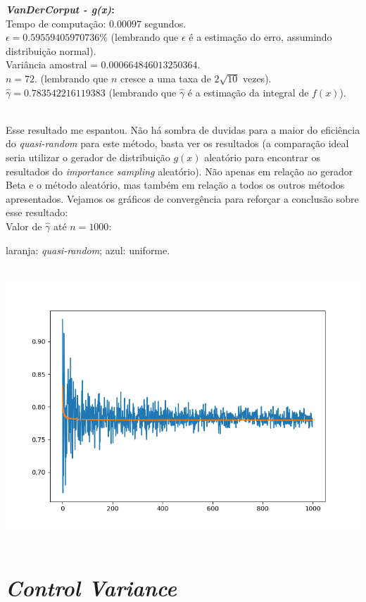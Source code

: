 \documentclass[pt12]{article}
\begin{document}
\textbf{\textit{VanDerCorput - g(x)}:}\\
\noindent Tempo de computação: $0.00097$ segundos.\\
\noindent $\epsilon = 0.59559405970736\%$ (lembrando que $\epsilon$ é a estimação do erro, assumindo distribuição normal).\\
\noindent Variância amostral = $0.000664846013250364$.\\
\noindent $n = 72$. (lembrando que $n$ cresce a uma taxa de $2\sqrt{10}$ vezes).\\
\noindent $\hat{\gamma} = 0.783542216119383$ (lembrando que $\hat{\gamma}$ é a estimação da integral de $f(x)$).\\
\ 

Esse resultado me espantou. Não há sombra de duvidas para a maior do eficiência do \textit{quasi-random} para este método, basta ver os resultados (a comparação ideal seria utilizar o gerador de distribuição $g(x)$ aleatório para encontrar os resultados do \textit{importance sampling} aleatório). Não apenas em relação ao gerador Beta e o método aleatório, mas também em relação a todos os outros métodos apresentados. Vejamos os gráficos de convergência para reforçar a conclusão sobre esse resultado:\\


Valor de $\hat{\gamma}$ até $n=1000$:\\
\indent \begin{small}laranja: \textit{quasi-random}; azul: uniforme.\end{small}\\
\includegraphics[scale=0.7]{conver_smp.png}
\ 

\section{\textit{Control Variance}}
\ 
\end{document}
